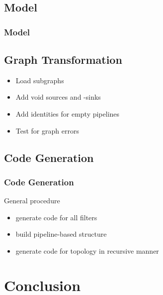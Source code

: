 \documentclass{beamer}
\begin{document}
\subsection{Model}
\begin{frame}
\frametitle{Model}
\end{frame}

\subsection{Graph Transformation}
\begin{frame}
	\begin{itemize}
		\item Load subgraphs
		\item Add void sources and -sinks
		\item Add identities for empty pipelines
		\item Test for graph errors %
	\end{itemize}
\end{frame}

\subsection{Code Generation}
\begin{frame}
\frametitle{Code Generation}
	\begin{block}{General procedure}
		\begin{itemize}
			\item generate code for all filters
			\item build pipeline-based structure
			\item generate code for topology in recursive manner
		\end{itemize}
	\end{block}

\end{frame}

\section{Conclusion}

\end{document}
